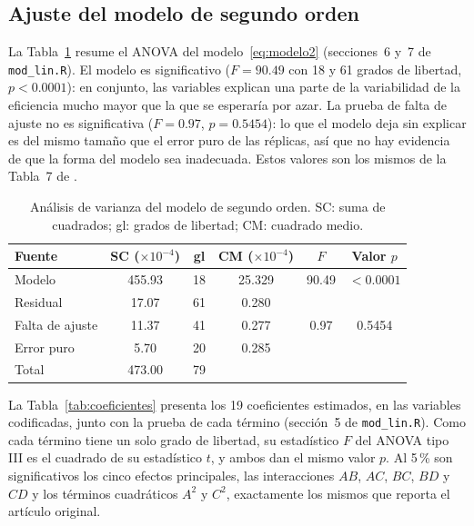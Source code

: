 
\subsection{Ajuste del modelo de segundo orden}
\label{sec:ajuste}

La Tabla~\ref{tab:anova_modelo} resume el ANOVA del modelo~\eqref{eq:modelo2} (secciones~6 y~7 de \texttt{mod\_lin.R}). El modelo es significativo ($F = 90.49$ con 18 y 61 grados de libertad, $p < 0.0001$): en conjunto, las variables explican una parte de la variabilidad de la eficiencia mucho mayor que la que se esperaría por azar. La prueba de falta de ajuste no es significativa ($F = 0.97$, $p = 0.5454$): lo que el modelo deja sin explicar es del mismo tamaño que el error puro de las réplicas, así que no hay evidencia de que la forma del modelo sea inadecuada. Estos valores son los mismos de la Tabla~7 de \citet{Lakdawala2025}.

\begin{table}[ht]
\centering
\caption{Análisis de varianza del modelo de segundo orden. SC: suma de cuadrados; gl: grados de libertad; CM: cuadrado medio.}
\label{tab:anova_modelo}
\begin{tabular}{lccccc}
\toprule
Fuente & SC ($\times 10^{-4}$) & gl & CM ($\times 10^{-4}$) & $F$ & Valor $p$ \\
\midrule
Modelo           & 455.93 & 18 & 25.329 & 90.49 & $<0.0001$ \\
Residual         &  17.07 & 61 &  0.280 &       &           \\
\quad Falta de ajuste & 11.37 & 41 & 0.277 & 0.97 & 0.5454 \\
\quad Error puro &   5.70 & 20 &  0.285 &       &           \\
Total            & 473.00 & 79 &       &       &           \\
\bottomrule
\end{tabular}
\end{table}

La Tabla~\ref{tab:coeficientes} presenta los 19 coeficientes estimados, en las variables codificadas, junto con la prueba de cada término (sección~5 de \texttt{mod\_lin.R}). Como cada término tiene un solo grado de libertad, su estadístico $F$ del ANOVA tipo III es el cuadrado de su estadístico $t$, y ambos dan el mismo valor $p$. Al 5\,\% son significativos los cinco efectos principales, las interacciones $AB$, $AC$, $BC$, $BD$ y $CD$ y los términos cuadráticos $A^2$ y $C^2$, exactamente los mismos que reporta el artículo original.

